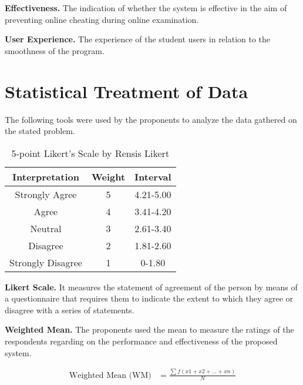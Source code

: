 \textbf{Effectiveness.}
The indication of whether the system is effective in the aim of preventing online cheating during online examination.

\textbf{User Experience.}
The experience of the student users in relation to the smoothness of the program.

\section{Statistical Treatment of Data}

The following tools were used by the proponents to analyze the data gathered on the stated problem.

\begin{table}[h!]
   \begin{center}
      \begin{tabular}{|c|c|c|}
         \hline
         \textbf{Interpretation} & \textbf{Weight} & \textbf{Interval} \\
         \hline
         Strongly Agree          & 5               & 4.21-5.00         \\
         \hline
         Agree                   & 4               & 3.41-4.20         \\
         \hline
         Neutral                 & 3               & 2.61-3.40         \\
         \hline
         Disagree                & 2               & 1.81-2.60         \\
         \hline
         Strongly Disagree       & 1               & 0-1.80            \\
         \hline
      \end{tabular}
   \end{center}
   \caption{5-point Likert's Scale by Rensis Likert}
\end{table}

\textbf{Likert Scale.}
It measures the statement of agreement of the person by means of a questionnaire that requires them to indicate the extent to which they agree or disagree with a series of statements.

\textbf{Weighted Mean.}
The proponents used the mean to measure the ratings of the respondents regarding on the performance and effectiveness of the proposed system.

\begin{equation*}
   \begin{split}
      \text{Weighted Mean (WM)} & = \frac{\sum f(x1 + x2 + ... + xn)}{N} \\
   \end{split}
\end{equation*}

